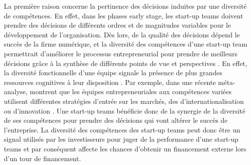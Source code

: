 \documentclass[12pt]{article}
\begin{document}
La première raison concerne la pertinence des décisions induites par une diversité de compétences. En effet, dans les phases early stage, les start-up teams doivent prendre des décisions de différents ordres et de magnitudes variables pour le développement de l'organisation. Dès lors, de la qualité des décisions dépend le succès de la firme numérique, et la diversité des compétences d'une start-up team permettrait d'améliorer le processus entrepreneurial pour prendre de meilleurs décisions grâce à la synthèse de différents points de vue et perspectives \citep{sirmon2011resource}. En effet, la diversité fonctionnelle d'une équipe signale la présence de plus grandes ressources cognitives à leur disposition \citep{bunderson2002comparing}. Par exemple, dans une récente méta-analyse, \citet{jin2017entrepreneurial} montrent que les équipes entrepreneuriales aux compétences variées utilisent différentes stratégies d'entrée sur les marchés, des d'internationalisation ou d'innovation \citep{boeker1989strategic}. Une start-up teams bénéficie donc de la synergie de la diversité de ses compétences pour prendre des décisions qui vont altérer le succès de l'entreprise. La diversité des compétences des start-up teams peut donc être un signal utilisés par les investisseurs pour juger de la performance d'une start-up teams et par conséquent affecte les chances d'obtenir un financement externe lors d'un tour de financement.
\end{document}
